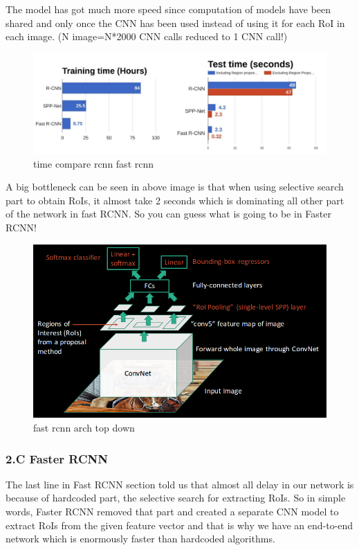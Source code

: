 \documentclass[11pt]{article}
\makeatletter
\def\maxwidth{\ifdim\Gin@nat@width>\linewidth\linewidth
    \else\Gin@nat@width\fi}
\let\Oldincludegraphics\includegraphics
\renewcommand{\includegraphics}[1]{\Oldincludegraphics[width=.8\maxwidth]{#1}}
\makeatother
\begin{document}
The model has got much more speed since computation of models have been
shared and only once the CNN has been used instead of using it for each
RoI in each image. (N image=N*2000 CNN calls reduced to 1 CNN call!)

\begin{figure}
\centering
\includegraphics{wiki/fast3.png}
\caption{time compare rcnn fast rcnn}
\end{figure}

A big bottleneck can be seen in above image is that when using selective
search part to obtain RoIs, it almost take 2 seconds which is dominating
all other part of the network in fast RCNN. So you can guess what is
going to be in Faster RCNN!

\begin{figure}
\centering
\includegraphics{wiki/fast4.png}
\caption{fast rcnn arch top down}
\end{figure}

    \hypertarget{c-faster-rcnn}{%
\subsubsection{2.C Faster RCNN}\label{c-faster-rcnn}}

The last line in Fast RCNN section told us that almost all delay in our
network is because of hardcoded part, the selective search for
extracting RoIs. So in simple words, Faster RCNN removed that part and
created a separate CNN model to extract RoIs from the given feature
vector and that is why we have an end-to-end network which is enormously
faster than hardcoded algorithms.
\end{document}
